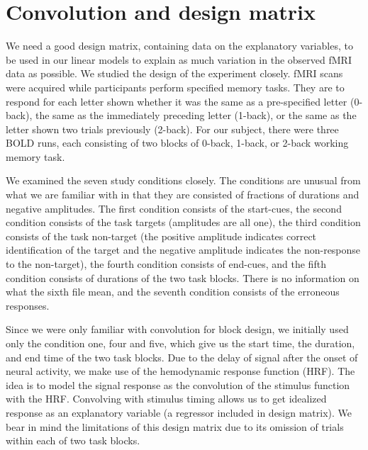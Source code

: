 \section{Convolution and design matrix}

We need a good design matrix, containing data on the explanatory variables, to
be used in our linear models to explain as much variation in the observed fMRI
data as possible. We studied the design of the experiment closely. fMRI scans were
acquired while participants perform specified memory tasks. They are to respond
for each letter shown whether it was the same as a pre-specified letter
(0-back), the same as the immediately preceding letter (1-back), or the same as
the letter shown two trials previously (2-back). For our subject, there were
three BOLD runs, each consisting of two blocks of 0-back, 1-back, or 2-back
working memory task. 

We examined the seven study conditions closely. The conditions are unusual from
what we are familiar with in that they are consisted of fractions of durations
and negative amplitudes. The first condition consists of
the start-cues, the second condition consists of the task targets (amplitudes
are all one), the third condition consists of the task non-target (the positive amplitude indicates
correct identification of the target and the negative amplitude indicates the
non-response to the non-target), the fourth condition consists of end-cues, and
the fifth condition consists of durations of the two task blocks. There is no
information on what the sixth file mean, and the seventh condition consists of
the erroneous responses.

Since we were only familiar with convolution for block design, we initially used
only the condition one, four and five, which give us the start time, the
duration, and end time of the two task blocks. Due to the delay of signal after
the onset of neural activity, we make use of the hemodynamic response
function (HRF). The idea is to model the signal response as the convolution of
the stimulus function with the HRF. Convolving with stimulus timing allows us to
get idealized response as an explanatory variable (a regressor included in
design matrix). We bear in mind the limitations of this
design matrix due to its omission of trials within each of two task blocks. 

